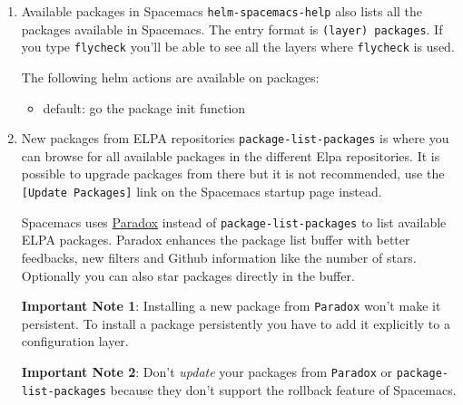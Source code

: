\documentclass[11pt]{article}
\begin{document}
\begin{enumerate}
\item Available packages in Spacemacs
\label{sec:orgc395d59}
\texttt{helm-spacemacs-help} also lists all the packages available in Spacemacs. The
entry format is \texttt{(layer) packages}. If you type \texttt{flycheck} you'll be able to see
all the layers where \texttt{flycheck} is used.

The following helm actions are available on packages:
\begin{itemize}
\item default: go the package init function
\end{itemize}

\item New packages from ELPA repositories
\label{sec:org0092d35}
\texttt{package-list-packages} is where you can browse for all available packages in the
different Elpa repositories. It is possible to upgrade packages from there but
it is not recommended, use the \texttt{[Update Packages]} link on the Spacemacs startup
page instead.

Spacemacs uses \href{https://github.com/Bruce-Connor/paradox}{Paradox} instead of \texttt{package-list-packages} to list available
ELPA packages. Paradox enhances the package list buffer with better feedbacks,
new filters and Github information like the number of stars. Optionally you can
also star packages directly in the buffer.

\textbf{Important Note 1}: Installing a new package from \texttt{Paradox} won't make it
persistent. To install a package persistently you have to add it explicitly to a
configuration layer.

\textbf{Important Note 2}: Don't \emph{update} your packages from \texttt{Paradox} or
\texttt{package-list-packages} because they don't support the rollback feature of
Spacemacs.


\end{enumerate}
\end{document}
